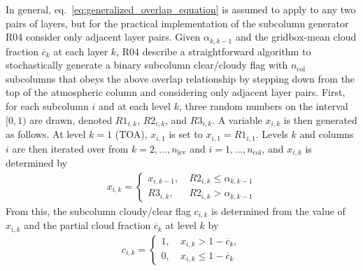 In general, eq.~\ref{eq:generalized_overlap_equation} is assumed to
apply to any two pairs of layers, but for the practical implementation
of the subcolumn generator R04 consider only adjacent layer pairs. Given
\(\alpha_{k, k-1}\) and the gridbox-mean cloud fraction
\(\overline{c}_{k}\) at each layer \(k\), R04 describe a straightforward
algorithm to stochastically generate a binary subcolumn clear/cloudy
flag with \(n_\textrm{col}\) subcolumns that obeys the above overlap
relationship by stepping down from the top of the atmospheric column and
considering only adjacent layer pairs. First, for each subcolumn \(i\)
and at each level \(k\), three random numbers on the interval \([0, 1)\)
are drawn, denoted \(R1_{i, k}\), \(R2_{i, k}\), and \(R3_{i, k}\). A
variable \(x_{i, k}\) is then generated as follows. At level \(k = 1\)
(TOA), \(x_{i, 1}\) is set to \(x_{i, 1} = R1_{i, 1}\). Levels \(k\) and
columns \(i\) are then iterated over from
\(k = 2, \ldots, n_\textrm{lev}\) and \(i = 1, \ldots, n_\textrm{col}\),
and \(x_{i, k}\) is determined by \[\begin{gathered} 
    x_{i, k} = \begin{cases} 
        x_{i, k-1}, ~ & R2_{i, k} \le \alpha_{k, k-1} \\ 
        R3_{i, k}, ~ & R2_{i, k} > \alpha_{k, k-1}
    \end{cases}
\end{gathered}\] From this, the subcolumn cloudy/clear flag \(c_{i,k}\)
is determined from the value of \(x_{i, k}\) and the partial cloud
fraction \(\overline{c}_{k}\) at level \(k\) by \[\begin{gathered} 
    c_{i, k} = \begin{cases} 
        1, ~ & x_{i, k} > 1 - \overline{c}_{k}, \\ 
        0, ~ & x_{i, k} \le 1 - \overline{c}_{k} 
    \end{cases}
\end{gathered}\]

